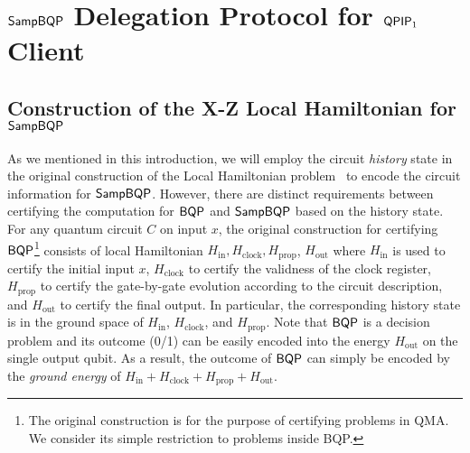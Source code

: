 \section{$\operatorname{\mathsf{SampBQP}}$ Delegation Protocol for $\operatorname{\mathsf{QPIP}}_1$ Client}
\label{sec:sampbqp}

\def \Hin {H_{\mathrm{in}}}
\def \Hout {H_{\mathrm{out}}}
\def \Hprop {H_{\mathrm{prop}}}
\def \Hclock {H_{\mathrm{clock}}}
\def \Jclock {J_{\mathrm{clock}}}
\def \Jprop {J_{\mathrm{prop}}}
\def \Kin {K_{\mathrm{in}}}
\def \Kclock {K_{\mathrm{clock}}}
\def \Kprop {K_{\mathrm{prop}}}

\newcommand{\histpsi}[1]{\ket{\psi_{#1}^{\mathrm{hist}}}}
\newcommand{\LHXZ}[1]{\mathrm{LH}_{\mathrm{XZ}}^{#1}}
\newcommand{\ground}[1]{{\lambda \left (#1 \right)}}


\subsection{Construction of the X-Z Local Hamiltonian for $\operatorname{\mathsf{SampBQP}}$} \label{sec:LHXZ}
As we mentioned in this introduction, we will employ the circuit \emph{history} state in the original construction of the Local Hamiltonian problem~\cite{kitaev2002classical} to encode the circuit information for $\operatorname{\mathsf{SampBQP}}$. 
However, there are distinct requirements between certifying the computation for $\operatorname{\mathsf{BQP}}$ and $\operatorname{\mathsf{SampBQP}}$ based on the history state.
For any quantum circuit $C$ on input $x$, the original construction for certifying $\operatorname{\mathsf{BQP}}$\footnote{The original construction is for the purpose of certifying problems in QMA. We consider its simple restriction to problems inside BQP.} consists of local Hamiltonian $\Hin, \Hclock, \Hprop$, $\Hout$ where $\Hin$ is used to certify the initial input $x$, $\Hclock$ to certify the validness of the clock register,  $\Hprop$ to certify the gate-by-gate evolution according to the circuit description, and $\Hout$ to certify the final output. 
In particular, the corresponding history state is in the ground space of $\Hin$, $\Hclock$, and $\Hprop$. Note that $\operatorname{\mathsf{BQP}}$ is a decision problem and its outcome (0/1) can be easily encoded into the energy $\Hout$ on the single output qubit. 
As a result, the outcome of $\operatorname{\mathsf{BQP}}$ can simply be encoded by the \emph{ground energy} of $\Hin + \Hclock+\Hprop + \Hout$. 

